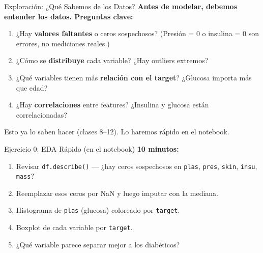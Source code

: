 \documentclass[aspectratio=169, 11pt]{beamer}
\begin{document}
\begin{frame}[shrink=5]{Exploración: ¿Qué Sabemos de los Datos?}
  \vspace{-4pt}
  {\footnotesize\color{arcaDark}\bfseries
    Antes de modelar, debemos \textbf{entender} los datos.
    Preguntas clave:}

  \vspace{6pt}
  {\footnotesize
  \begin{enumerate}\setlength{\itemsep}{5pt}
    \item[{\color{arcaRed}\bfseries 1.}]
      ¿Hay \textbf{valores faltantes} o ceros sospechosos?
      (Presión = 0 o insulina = 0 son errores, no mediciones reales.)
    \item[{\color{arcaRed}\bfseries 2.}]
      ¿Cómo se \textbf{distribuye} cada variable?
      ¿Hay outliers extremos?
    \item[{\color{arcaRed}\bfseries 3.}]
      ¿Qué variables tienen más \textbf{relación con el target}?
      ¿Glucosa importa más que edad?
    \item[{\color{arcaRed}\bfseries 4.}]
      ¿Hay \textbf{correlaciones} entre features?
      ¿Insulina y glucosa están correlacionadas?
  \end{enumerate}
  }

  \vspace{4pt}
  {\scriptsize\color{textMuted}
    \faLightbulb\hspace{4pt} Esto ya lo saben hacer (clases 8--12).
    Lo haremos rápido en el notebook.}
\end{frame}

\begin{frame}[shrink=5]{Ejercicio 0: EDA Rápido (en el notebook)}
  \vspace{-4pt}
  {\footnotesize\color{arcaDark}\bfseries
    \faClock\hspace{4pt} 10 minutos:}

  \vspace{6pt}
  {\footnotesize
  \begin{enumerate}\setlength{\itemsep}{4pt}
    \item Revisar \texttt{df.describe()} --- ¿hay ceros sospechosos en
      \texttt{plas}, \texttt{pres}, \texttt{skin}, \texttt{insu}, \texttt{mass}?
    \item Reemplazar esos ceros por NaN y luego imputar con la mediana.
    \item Histograma de \texttt{plas} (glucosa) coloreado por \texttt{target}.
    \item Boxplot de cada variable por \texttt{target}.
    \item ¿Qué variable parece separar mejor a los diabéticos?
  \end{enumerate}
  }
\end{frame}
\end{document}
